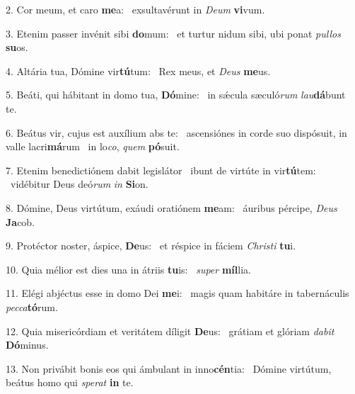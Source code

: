 2. Cor meum, et caro \textbf{me}a: \ast\  exsultavérunt in \textit{De}\textit{um} \textbf{vi}vum.\

3. Etenim passer invénit sibi \textbf{do}mum: \ast\  et turtur nidum sibi, ubi ponat \textit{pul}\textit{los} \textbf{su}os.\

4. Altária tua, Dómine vir\textbf{tú}tum: \ast\  Rex meus, et \textit{De}\textit{us} \textbf{me}us.\

5. Beáti, qui hábitant in domo tua, \textbf{Dó}mine: \ast\  in sǽcula sæculó\textit{rum} \textit{lau}\textbf{dá}bunt te.\

6. Beátus vir, cujus est auxílium abs te: \dag\  ascensiónes in corde suo dispósuit, in valle lacri\textbf{má}rum \ast\  in lo\textit{co}, \textit{quem} \textbf{pó}suit.\

7. Etenim benedictiónem dabit legislátor \dag\  ibunt de virtúte in vir\textbf{tú}tem: \ast\  vidébitur Deus deó\textit{rum} \textit{in} \textbf{Si}on.\

8. Dómine, Deus virtútum, exáudi oratiónem \textbf{me}am: \ast\  áuribus pércipe, \textit{De}\textit{us} \textbf{Ja}cob.\

9. Protéctor noster, áspice, \textbf{De}us: \ast\  et réspice in fáciem \textit{Chris}\textit{ti} \textbf{tu}i.\

10. Quia mélior est dies una in átriis \textbf{tu}is: \ast\  \textit{su}\textit{per} \textbf{míl}lia.\

11. Elégi abjéctus esse in domo Dei \textbf{me}i: \ast\  magis quam habitáre in tabernáculis \textit{pec}\textit{ca}\textbf{tó}rum.\

12. Quia misericórdiam et veritátem díligit \textbf{De}us: \ast\  grátiam et glóriam \textit{da}\textit{bit} \textbf{Dó}minus.\

13. Non privábit bonis eos qui ámbulant in inno\textbf{cén}tia: \ast\  Dómine virtútum, beátus homo qui \textit{spe}\textit{rat} \textbf{in} te.\


